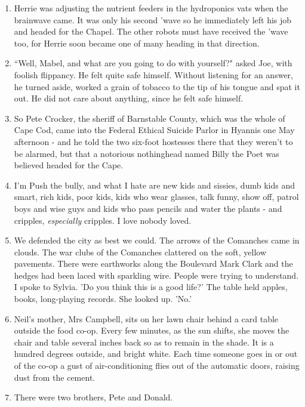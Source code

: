 \documentclass[11pt]{article}
\begin{document}
\begin{enumerate}
\item Herrie was adjusting the nutrient feeders in the
hydroponics vats when the brainwave came. It was only his second 'wave so
he immediately left his job and headed for the Chapel. The other robots
must have received the 'wave too, for Herrie soon became one of many
heading in that direction.

\item ``Well, Mabel, and what are you going to do with yourself?" asked Joe, with
foolish flippancy. He felt quite safe himself. Without listening for an
answer, he turned aside, worked a grain of tobacco to the tip of his tongue
and spat it out. He did not care about anything, since he felt safe
himself.

\item So Pete Crocker, the sheriff of Barnstable County, which was the whole of
Cape Cod, came into the Federal Ethical Suicide Parlor in Hyannis one May
afternoon - and he told the two six-foot hostesses there that they weren't
to be alarmed, but that a notorious nothinghead named Billy the Poet was
believed headed for the Cape.

\item I'm Push the bully, and what I hate are new kids and sissies, dumb kids and
smart, rich kids, poor kids, kids who wear glasses, talk funny, show off,
patrol boys and wise guys and kids who pass pencils and water the plants -
and cripples, \textit{especially} cripples. I love nobody loved.

\item We defended the city as best we could. The arrows of the Comanches came in
clouds. The war clubs of the Comanches clattered on the soft, yellow
pavements. There were earthworks along the Boulevard Mark Clark and the
hedges had been laced with sparkling wire. People were trying to
understand. I spoke to Sylvia. 'Do you think this is a good life?' The
table held apples, books, long-playing records. She looked up. 'No.'

\item Neil's mother, Mrs Campbell, sits on her lawn chair behind a card table
outside the food co-op. Every few minutes, as the sun shifts, she moves the
chair and table several inches back so as to remain in the shade. It is a
hundred degrees outside, and bright white. Each time someone goes in or out
of the co-op a gust of air-conditioning flies out of the automatic doors,
raising dust from the cement.

\item There were two brothers, Pete and Donald.


\end{enumerate}
\end{document}
